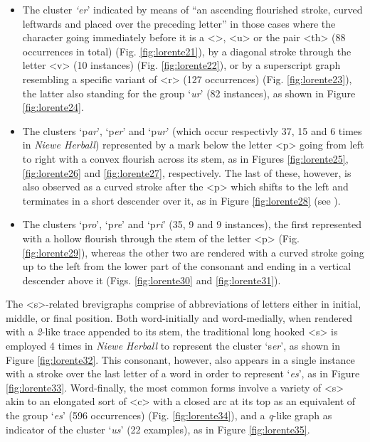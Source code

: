 \begin{paper}
\begin{itemize}
\item
  The cluster \emph{`er}' indicated by means of ``an ascending
  flourished stroke, curved leftwards and placed over the preceding
  letter'' \citep[119]{calle-martin_corpus-based_2021} in those cases where the character
  going immediately before it is a \textless \th\textgreater,
  \textless u\textgreater{} or the pair \textless th\textgreater{} (88
  occurrences in total) (Fig. \ref{fig:lorente21}), by a diagonal stroke through the
  letter \textless v\textgreater{} (10 instances) \citep[131]{tannenbaum_handwriting_1930}
  (Fig. \ref{fig:lorente22}), or by a superscript graph resembling a specific variant
  of \textless r\textgreater{} (127 occurrences) (Fig. \ref{fig:lorente23}), the latter
  also standing for the group `\emph{ur}' (82 instances), as shown in
  Figure \ref{fig:lorente24}.
\item
  The clusters `p\emph{ar}', `p\emph{er}' and `p\emph{ur}' (which occur respectivly 37, 15 and 6 times in \emph{Niewe Herball}) represented by a mark below
  the letter \textless p\textgreater{} going from left to right with a
  convex flourish across its stem, as in Figures \ref{fig:lorente25}, \ref{fig:lorente26} and \ref{fig:lorente27},
  respectively. The last of these, however, is also observed as a curved stroke after the \textless p\textgreater{} which
  shifts to the left and terminates in a short descender over it, as in
  Figure \ref{fig:lorente28} (see \cite[128--129]{tannenbaum_handwriting_1930}).
\item
  The clusters `p\emph{ro}', `p\emph{re}' and `p\emph{ri}' (35, 9 and 9
  instances), the first represented with a hollow flourish through the
  stem of the letter \textless p\textgreater{} (Fig. \ref{fig:lorente29}), whereas the
  other two are rendered with a curved stroke going up to the left from
  the lower part of the consonant and ending in a vertical descender
  above it (Figs. \ref{fig:lorente30} and \ref{fig:lorente31}).
\end{itemize}

The \textless s\textgreater-related brevigraphs
comprise of abbreviations of letters either in initial, middle, or
final position. Both word-initially and word-medially, when rendered
with a \emph{2}-like trace appended to its stem, the traditional long
hooked \textless s\textgreater{} is employed 4 times in \emph{Niewe
Herball} to represent the cluster `s\emph{er}', as shown in Figure \ref{fig:lorente32}.
This consonant, however, also appears in a single instance with a stroke
over the last letter of a word in order to represent `\emph{es}', as in
Figure \ref{fig:lorente33}. Word-finally, the most common forms involve a variety of
\textless s\textgreater{} akin to an elongated sort of
\textless c\textgreater{} with a closed arc at its top as an equivalent
of the group `\emph{es}' (596 occurrences) (Fig. \ref{fig:lorente34}), and a
\emph{q}-like graph as indicator of the cluster `\emph{us}' (22
examples), as in Figure \ref{fig:lorente35}.


\end{paper}
